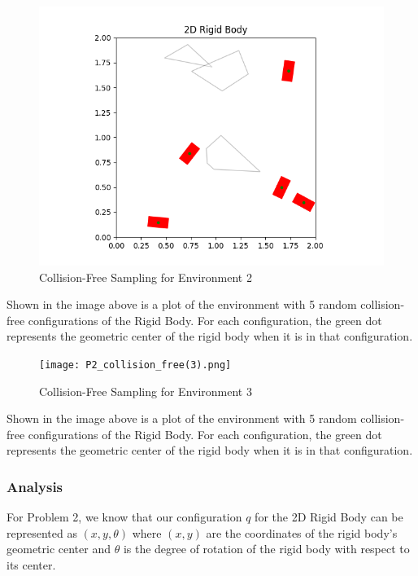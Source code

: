 \documentclass{article}
\begin{document}
\newpage 
\begin{figure}[h!]
	\includegraphics[width= 0.9 \linewidth]{P2_collision_free(2).png}
	\centering
	\caption{Collision-Free Sampling for Environment 2}
	\label{P2_collision_free(2).png}
\end{figure}
Shown in the image above is a plot of the environment with 5 random collision-free configurations of the Rigid Body. For each configuration, the green dot represents the geometric center of the rigid body when it is in that configuration. 

\newpage 
\begin{figure}[h!]
	\texttt{[image: P2\_collision\_free(3).png]}
	\centering
	\caption{Collision-Free Sampling for Environment 3}
	\label{P2_collision_free(3).png}
\end{figure}
Shown in the image above is a plot of the environment with 5 random collision-free configurations of the Rigid Body. For each configuration, the green dot represents the geometric center of the rigid body when it is in that configuration. 



\newpage 
\subsubsection{Analysis}
For Problem 2, we know that our configuration $q$ for the 2D Rigid Body can be represented as $(x, y, \theta)$ where $(x, y)$ are the coordinates of the rigid body's geometric center and $\theta$ is the degree of rotation of the rigid body with respect to its center. 
\end{document}
